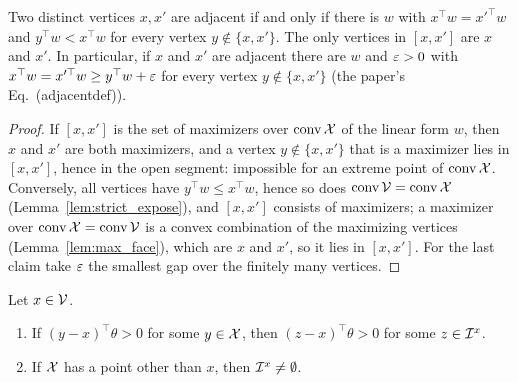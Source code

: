 \begin{lemma}
  \label{lem:is_adjacent_iff}
  \leanok
  Two distinct vertices $x, x'$ are adjacent if and only if there is $w$ with
  $x^\top w = x'^\top w$ and $y^\top w < x^\top w$ for every vertex $y \notin \{x, x'\}$. The only
  vertices in $[x, x']$ are $x$ and $x'$. In particular, if $x$ and $x'$ are adjacent there are
  $w$ and $\varepsilon > 0$ with $x^\top w = x'^\top w \ge y^\top w + \varepsilon$ for every vertex
  $y \notin \{x, x'\}$ (the paper's Eq.~(adjacentdef)).
\end{lemma}

\begin{proof}
  \leanok
  If $[x, x']$ is the set of maximizers over $\operatorname{conv} \mathcal{X}$ of the linear form $w$, then $x$ and $x'$ are
  both maximizers, and a vertex $y \notin \{x, x'\}$ that is a maximizer lies in $[x, x']$, hence in
  the open segment: impossible for an extreme point of $\operatorname{conv} \mathcal{X}$. Conversely, all vertices have
  $y^\top w \le x^\top w$, hence so does $\operatorname{conv} \mathcal{V} = \operatorname{conv} \mathcal{X}$ (Lemma~\ref{lem:strict_expose}), and
  $[x, x']$ consists of maximizers; a maximizer over $\operatorname{conv} \mathcal{X} = \operatorname{conv} \mathcal{V}$ is a convex combination of
  the maximizing vertices (Lemma~\ref{lem:max_face}), which are $x$ and $x'$, so it lies in
  $[x, x']$. For the last claim take $\varepsilon$ the smallest gap over the finitely many vertices.
\end{proof}

\begin{lemma}
  \label{lem:local_global}
  \leanok
  Let $x \in \mathcal{V}$.
  \begin{enumerate}
    \item If $(y - x)^\top \theta > 0$ for some $y \in \mathcal{X}$, then $(z - x)^\top \theta > 0$ for some
      $z \in \mathcal{I}^x$.
    \item If $\mathcal{X}$ has a point other than $x$, then $\mathcal{I}^x \ne \emptyset$.
  \end{enumerate}
\end{lemma}

